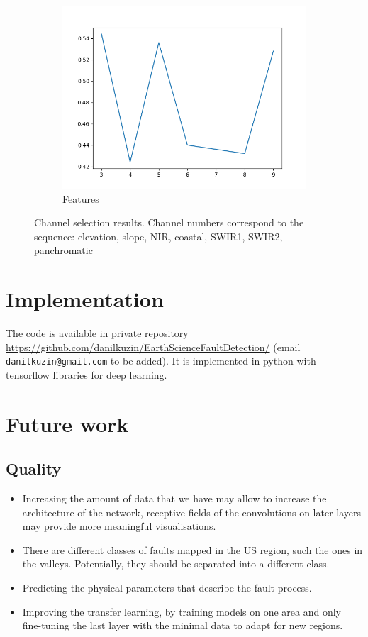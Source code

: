 \documentclass[11pt,a4paper]{article}
\begin{document}
\begin{figure}[t]
    \centering
    \begin{subfigure}[b]{0.3\textwidth}
        \includegraphics[width=\textwidth]{graphics/feature_selection.png}
        \caption{Features}
    \end{subfigure}

    \caption{Channel selection results. Channel numbers correspond to the sequence: elevation, slope, NIR, coastal,
    SWIR1, SWIR2, panchromatic}
    \label{fig:feature_selection}
\end{figure}

\section{Implementation}
The code is available in private repository \url{https://github.com/danilkuzin/EarthScienceFaultDetection/}
(email \texttt{danilkuzin@gmail.com} to be added). It is
implemented in python with tensorflow libraries for deep learning.

\section{Future work}
\subsection{Quality}
    \begin{itemize}
        \item Increasing the amount of data that we have may allow to increase the architecture of the network, receptive
            fields of the convolutions on later layers may provide more meaningful visualisations.
        \item There are different classes of faults mapped in the US region, such the ones in the valleys. Potentially,
            they should be separated into a different class.
        \item Predicting the physical parameters that describe the fault process.
        \item Improving the transfer learning, by training models on one area and only fine-tuning the last layer with
            the minimal data to adapt for new regions.
    \end{itemize}
\end{document}
